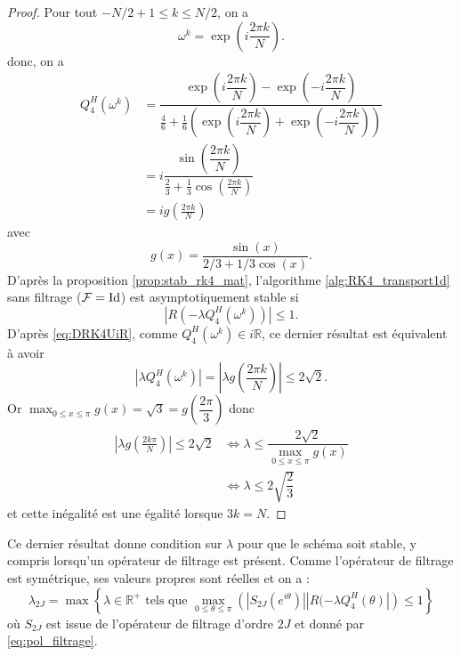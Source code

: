 \begin{proof}
Pour tout $-N/2 + 1 \leq k \leq N/2$, on a
\begin{equation}
\omega^k = \exp \left( i \dfrac{2 \pi k}{N} \right).
\end{equation}
donc, on a 
\begin{align*}
Q_4^H(\omega^k) & = \dfrac{\exp \left( i \dfrac{2 \pi k}{N} \right) - \exp \left(- i \dfrac{2 \pi k}{N} \right)}{\frac{4}{6} + \frac{1}{6} \left( \exp \left( i \dfrac{2 \pi k}{N} \right) + \exp \left( -i \dfrac{2 \pi k}{N} \right) \right)} \\
		& = i \dfrac{\sin \left( \dfrac{2 \pi k}{N} \right)}{\frac{2}{3} + \frac{1}{3} \cos \left( \frac{2 \pi k}{N} \right)}\\
		& = i g \left( \frac{2 \pi k}{N} \right)
\end{align*}
avec 
\begin{equation}
g(x) = \dfrac{\sin(x)}{2/3 + 1/3 \cos (x)}.
\end{equation}
D'après la proposition \ref{prop:stab_rk4_mat}, l'algorithme \ref{alg:RK4_transport1d} sans filtrage ($\mathcal{F} = \text{Id}$) est asymptotiquement stable si
\begin{equation}
| R(- \lambda Q_4^H(\omega^k))| \leq 1.
\end{equation}
D'après \eqref{eq:DRK4UiR}, comme $Q_4^H(\omega^k) \in i \mathbb{R}$, ce dernier résultat est équivalent à avoir 
\begin{equation}
|\lambda Q_4^H(\omega^k)| = |\lambda g \left( \frac{2\pi k}{N} \right)| \leq 2 \sqrt{2}.
\end{equation}
Or $\max_{0 \leq x \leq \pi} g(x) = \sqrt{3} = g \left(\dfrac{2 \pi}{3}\right)$ donc
\begin{align*}
| \lambda g \left( \frac{2 k \pi}{N} \right)| \leq 2 \sqrt{2} & \Leftrightarrow \lambda \leq \dfrac{2 \sqrt{2}}{\max_{0 \leq x \leq \pi} g(x)} \\
	& \Leftrightarrow \lambda \leq 2 \sqrt{\dfrac{2}{3}}
\end{align*}
et cette inégalité est une égalité lorsque $3k=N$.
\end{proof}

Ce dernier résultat donne condition sur $\lambda$ pour que le schéma soit stable, y compris lorsqu'un opérateur de filtrage est présent. Comme l'opérateur de filtrage est symétrique, ses valeurs propres sont réelles et on a :
\begin{equation}
\lambda_{2J} = \max \left\lbrace \lambda \in \mathbb{R}^+ \text{ tels que } \max_{0 \leq \theta \leq \pi} \left(|S_{2J}(e^{i \theta})| | R(-\lambda Q_4^H(\theta) | \right) \leq 1 \right\rbrace
\end{equation}
où $S_{2J}$ est issue de l'opérateur de filtrage d'ordre $2J$ et donné par \eqref{eq:pol_filtrage}.

